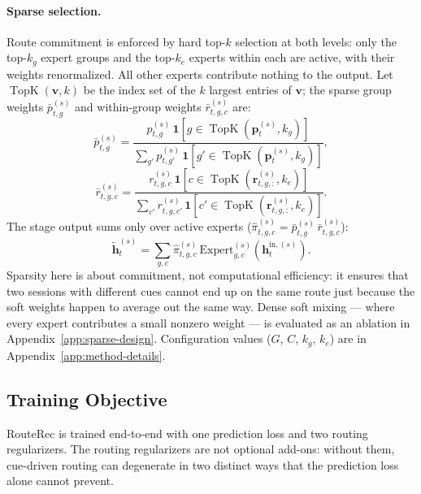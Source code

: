 \documentclass[sigconf,review,anonymous]{acmart}
\begin{document}
\paragraph{Sparse selection.}
Route commitment is enforced by hard top-$k$ selection at both levels: only the top-$k_g$ expert groups and the top-$k_e$ experts within each are active, with their weights renormalized. All other experts contribute nothing to the output. Let $\operatorname{TopK}(\mathbf{v},k)$ be the index set of the $k$ largest entries of $\mathbf{v}$; the sparse group weights $\bar{p}^{(s)}_{t,g}$ and within-group weights $\bar{r}^{(s)}_{t,g,c}$ are:
\begin{equation}
\bar{p}^{(s)}_{t,g} = \frac{p^{(s)}_{t,g}\,\mathbf{1}[g\in \operatorname{TopK}(\mathbf{p}^{(s)}_t,k_g)]}{\sum_{g'} p^{(s)}_{t,g'}\,\mathbf{1}[g'\in \operatorname{TopK}(\mathbf{p}^{(s)}_t,k_g)]},
\label{eq:sparse-route}
\end{equation}
\begin{equation}
\bar{r}^{(s)}_{t,g,c} = \frac{r^{(s)}_{t,g,c}\,\mathbf{1}[c\in \operatorname{TopK}(\mathbf{r}^{(s)}_{t,g,:},k_e)]}{\sum_{c'} r^{(s)}_{t,g,c'}\,\mathbf{1}[c'\in \operatorname{TopK}(\mathbf{r}^{(s)}_{t,g,:},k_e)]}.
\label{eq:sparse-within-group}
\end{equation}
The stage output sums only over active experts ($\hat{\pi}^{(s)}_{t,g,c} = \bar{p}^{(s)}_{t,g}\,\bar{r}^{(s)}_{t,g,c}$):
\begin{equation}
\tilde{\mathbf{h}}^{(s)}_t = \sum_{g,c}\hat{\pi}^{(s)}_{t,g,c}\,\mathrm{Expert}^{(s)}_{g,c}(\mathbf{h}^{\mathrm{in},(s)}_t).
\label{eq:sparse-stage-routing}
\end{equation}
Sparsity here is about commitment, not computational efficiency: it ensures that two sessions with different cues cannot end up on the same route just because the soft weights happen to average out the same way. Dense soft mixing --- where every expert contributes a small nonzero weight --- is evaluated as an ablation in Appendix~\ref{app:sparse-design}. Configuration values ($G$, $C$, $k_g$, $k_e$) are in Appendix~\ref{app:method-details}.

\subsection{Training Objective}
\label{sec:training-objective}

RouteRec is trained end-to-end with one prediction loss and two routing regularizers. The routing regularizers are not optional add-ons: without them, cue-driven routing can degenerate in two distinct ways that the prediction loss alone cannot prevent.
\end{document}
